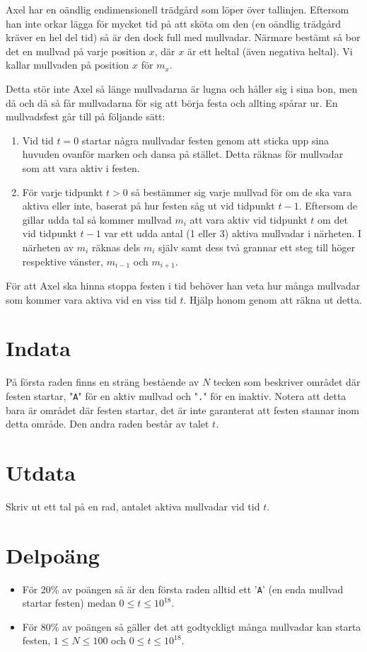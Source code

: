 
Axel har en oändlig endimensionell trädgård som löper över tallinjen. Eftersom han inte orkar lägga för mycket tid på att sköta om den (en oändlig trädgård kräver en hel del tid) så är den dock full med mullvadar. Närmare bestämt så bor det en mullvad på varje position $x$, där $x$ är ett heltal (även negativa heltal). Vi kallar mullvaden på position $x$ för $m_x$.

Detta stör inte Axel så länge mullvadarna är lugna och håller sig i sina bon, men då och då så får mullvadarna för sig att börja festa och allting spårar ur. En mullvadsfest går till på följande sätt:
\begin{enumerate}
\item Vid tid $t=0$ startar några mullvadar festen genom att sticka upp sina huvuden ovanför marken och dansa på stället. Detta räknas för mullvadar som att vara aktiv i festen.
\item För varje tidpunkt $t > 0$ så bestämmer sig varje mullvad för om de ska vara aktiva eller inte, baserat på hur festen såg ut vid tidpunkt $t-1$. Eftersom de gillar udda tal så kommer mullvad $m_i$ att vara aktiv vid tidpunkt $t$ om det vid tidpunkt $t-1$ var ett udda antal (1 eller 3) aktiva mullvadar i närheten. I närheten av $m_i$ räknas dels $m_i$ själv samt dess två grannar ett steg till höger respektive vänster, $m_{i-1}$ och $m_{i+1}$.
\end{enumerate}

För att Axel ska hinna stoppa festen i tid behöver han veta hur många mullvadar som kommer vara aktiva vid en viss tid $t$. Hjälp honom genom att räkna ut detta.

\section*{Indata}
På första raden finns en sträng bestående av $N$ tecken som beskriver området där festen startar, "\texttt{A}" för en aktiv mullvad och "\texttt{.}" för en inaktiv. Notera att detta bara är området där festen startar, det är inte garanterat att festen stannar inom detta område. Den andra raden består av talet $t$.

\section*{Utdata}
Skriv ut ett tal på en rad, antalet aktiva mullvadar vid tid $t$.

\section*{Delpoäng}
\begin{itemize}
\item För 20\% av poängen så är den första raden alltid ett '\texttt{A}' (en enda mullvad startar festen) medan $0 \leq t \leq 10^{18}$.
\item För 80\% av poängen så gäller det att godtyckligt många mullvadar kan starta festen, $1 \leq N \leq 100$ och $0 \leq t \leq 10^{18}$.
\end{itemize}


